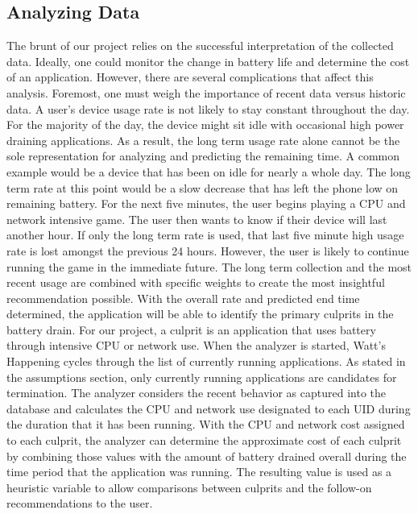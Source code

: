 \subsection*{Analyzing Data}
The brunt of our project relies on the successful interpretation of the collected data.  
Ideally, one could monitor the change in battery life and determine the cost of an application.  
However, there are several complications that affect this analysis.  
Foremost, one must weigh the importance of recent data versus historic data.  
A user's device usage rate is not likely to stay constant throughout the day.  
For the majority of the day, the device might sit idle with occasional high power draining applications. 
As a result, the long term usage rate alone cannot be the sole representation for analyzing and predicting the remaining time.  
A common example would be a device that has been on idle for nearly a whole day.  
The long term rate at this point would be a slow decrease that has left the phone low on remaining battery.  
For the next five minutes, the user begins playing a CPU and network intensive game.  
The user then wants to know if their device will last another hour.  
If only the long term rate is used, that last five minute high usage rate is lost amongst the previous 24 hours.  
However, the user is likely to continue running the game in the immediate future.  
The long term collection and the most recent usage are combined with specific weights to create the most insightful recommendation possible. 
With the overall rate and predicted end time determined, the application will be able to identify the primary culprits in the battery drain.  
For our project, a culprit is an application that uses battery through intensive CPU or network use.  
When the analyzer is started, Watt's Happening cycles through the list of currently running applications.  
As stated in the assumptions section, only currently running applications are candidates for termination.  
The analyzer considers the recent behavior as captured into the database and calculates the CPU and network use designated to each UID during the duration that it has been running.  
With the CPU and network cost assigned to each culprit, the analyzer can determine the approximate cost of each culprit by combining those values with the amount of battery drained overall during the time period that the application was running.  
The resulting value is used as a heuristic variable to allow comparisons between culprits and the follow-on recommendations to the user.

